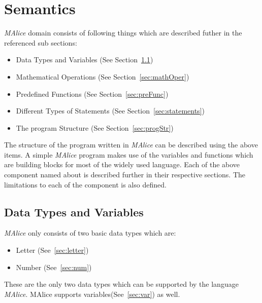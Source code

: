 \documentclass[a4wide, 11pt]{article}
\begin{document}
\section{Semantics}
\label{sec:semantics}
	\emph{MAlice} domain consists of following things which are described futher in the
		referenced sub sections:
	\begin{itemize}
		\item Data Types and Variables (See Section~\ref{sec:dtypes})
		\item Mathematical Operations (See Section~\ref{sec:mathOper})
		\item Predefined Functions (See Section~\ref{sec:preFunc})
		\item Different Types of Statements (See Section~\ref{sec:statements})
		\item The program Structure (See Section~\ref{sec:progStr}) 
	\end{itemize}
The structure of the program written in \emph{MAlice} can be described using the above items. A simple
\emph{MAlice} program makes use of the variables and functions which are building blocks
for most of the widely used language. Each of the above component named about is described further
in their respective sections. The limitations to each of the component is also defined.

\subsection{Data Types and Variables}
\label{sec:dtypes}
	\emph{MAlice} only consists of two basic data types which are:
	\begin{itemize}
		\item Letter (See~\ref{sec:letter})
		\item Number (See~\ref{sec:num})
	\end{itemize}
	These are the only two data types which can be supported by the language \emph{MAlice}. MAlice
	supports variables(See~\ref{sec:var}) as well.
\end{document}

